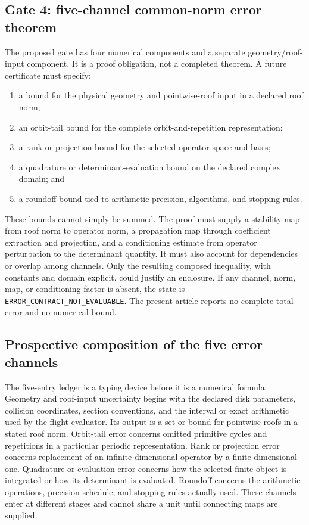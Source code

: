 \documentclass[11pt,a4paper]{article}
\providecommand{\tightlist}{\setlength{\itemsep}{0pt}\setlength{\parskip}{0pt}}
\begin{document}
\subsection{Gate 4: five-channel common-norm error theorem}

The proposed gate has four numerical components and a separate geometry/roof-input component. It is a proof obligation, not a completed theorem. A future certificate must specify:

\begin{enumerate}
\def\labelenumi{\arabic{enumi}.}
\tightlist
\item
  a bound for the physical geometry and pointwise-roof input in a declared roof norm;
\item
  an orbit-tail bound for the complete orbit-and-repetition representation;
\item
  a rank or projection bound for the selected operator space and basis;
\item
  a quadrature or determinant-evaluation bound on the declared complex domain; and
\item
  a roundoff bound tied to arithmetic precision, algorithms, and stopping rules.
\end{enumerate}

These bounds cannot simply be summed. The proof must supply a stability map from roof norm to operator norm, a propagation map through coefficient extraction and projection, and a conditioning estimate from operator perturbation to the determinant quantity. It must also account for dependencies or overlap among channels. Only the resulting composed inequality, with constants and domain explicit, could justify an enclosure. If any channel, norm, map, or conditioning factor is absent, the state is \texttt{ERROR\_CONTRACT\_NOT\_EVALUABLE}. The present article reports no complete total error and no numerical bound.

\subsection{Prospective composition of the five error channels}

The five-entry ledger is a typing device before it is a numerical formula. Geometry and roof-input uncertainty begins with the declared disk parameters, collision coordinates, section conventions, and the interval or exact arithmetic used by the flight evaluator. Its output is a set or bound for pointwise roofs in a stated roof norm. Orbit-tail error concerns omitted primitive cycles and repetitions in a particular periodic representation. Rank or projection error concerns replacement of an infinite-dimensional operator by a finite-dimensional one. Quadrature or evaluation error concerns how the selected finite object is integrated or how its determinant is evaluated. Roundoff concerns the arithmetic operations, precision schedule, and stopping rules actually used. These channels enter at different stages and cannot share a unit until connecting maps are supplied.
\end{document}
